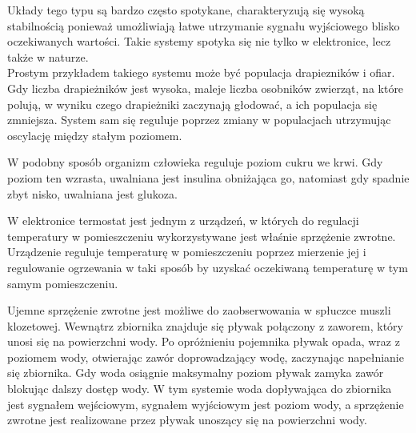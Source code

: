 \documentclass{article}
\begin{document}
\quad Układy tego typu są bardzo często spotykane, charakteryzują się wysoką stabilnością ponieważ umożliwiają łatwe utrzymanie sygnału wyjściowego blisko oczekiwanych wartości. Takie systemy spotyka się nie tylko w elektronice, lecz także w naturze.\\ Prostym przykładem takiego systemu może być populacja drapiezników i ofiar. Gdy liczba drapieżników jest wysoka, maleje liczba osobników zwierząt, na które polują, w wyniku czego drapieżniki zaczynają głodować, a ich populacja się zmniejsza. System sam się reguluje poprzez zmiany w populacjach utrzymując oscylację między stałym poziomem. 

W podobny sposób organizm człowieka reguluje poziom cukru we krwi. 
Gdy poziom ten wzrasta, uwalniana jest insulina obniżająca go, natomiast gdy spadnie zbyt nisko, uwalniana jest glukoza.

W elektronice termostat jest jednym z urządzeń, w których do regulacji temperatury w pomieszczeniu wykorzystywane jest właśnie sprzężenie zwrotne. 
Urządzenie reguluje temperaturę w pomieszczeniu poprzez mierzenie jej i regulowanie ogrzewania w taki sposób by uzyskać oczekiwaną temperaturę w tym samym pomieszczeniu.

Ujemne sprzężenie zwrotne jest możliwe do zaobserwowania w spłuczce muszli klozetowej. Wewnątrz zbiornika 
znajduje się pływak połączony z zaworem, który unosi się na powierzchni wody. Po opróżnieniu pojemnika pływak
opada, wraz z poziomem wody, otwierając zawór doprowadzający wodę, zaczynając napełnianie się zbiornika.
Gdy woda osiągnie maksymalny poziom pływak zamyka zawór blokując dalszy dostęp wody. W tym systemie woda dopływająca
do zbiornika jest sygnałem wejściowym, sygnałem wyjściowym jest poziom wody, a sprzężenie zwrotne jest realizowane
przez pływak unoszący się na powierzchni wody.
\end{document}
